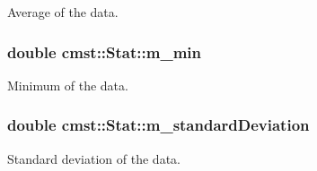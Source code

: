 Average of the data. 

\subsubsection[{\texorpdfstring{m\_min}{m_min}}]{\setlength{\rightskip}{0pt plus 5cm}double cmst::Stat::m\_min\hspace{0.3cm}{\ttfamily [private]}}\hypertarget{classcmst_1_1_stat_a2f503d58c0bc9eed8bd6d2c46edffbf4}{}\label{classcmst_1_1_stat_a2f503d58c0bc9eed8bd6d2c46edffbf4}


Minimum of the data. 

\subsubsection[{\texorpdfstring{m\_standardDeviation}{m_standardDeviation}}]{\setlength{\rightskip}{0pt plus 5cm}double cmst::Stat::m\_standardDeviation\hspace{0.3cm}{\ttfamily [private]}}\hypertarget{classcmst_1_1_stat_aa6321c420c546603588be13de4628957}{}\label{classcmst_1_1_stat_aa6321c420c546603588be13de4628957}


Standard deviation of the data. 

